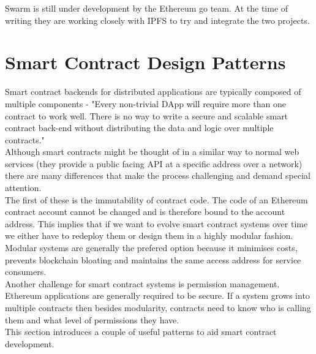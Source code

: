 Swarm is still under development by the Ethereum go team. At the time of writing they are working closely with IPFS to try and integrate the two projects\cite{DevUpdate}. \\

\section{Smart Contract Design Patterns}
\label{sec:scDesign}
Smart contract backends for distributed applications are typically composed of multiple components - "Every non-trivial DApp will require more than one contract to work well. There is no way to write a secure and scalable smart contract back-end without distributing the data and logic over multiple contracts."\cite{FiveTypes}\\

Although smart contracts might be thought of in a similar way to normal web services (they provide a public facing API at a specific address over a network) there are many differences that make the process challenging and demand special attention. \\

The first of these is the immutability of contract code. The code of an Ethereum contract account cannot be changed and is therefore bound to the account address. This implies that if we want to evolve smart contract systems over time we either have to redeploy them or design them in a highly modular fashion. Modular systems are generally the prefered option because it minimises costs, prevents blockchain bloating and maintains the same access address for service consumers. \\

Another challenge for smart contract systems is permission management. Ethereum applications are generally required to be secure. If a system grows into multiple contracts then besides modularity, contracts need to know who is calling them and what level of permissions they have. \\

This section introduces a couple of useful patterns to aid smart contract development.\\

